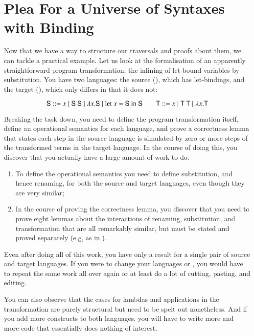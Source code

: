 \chapter{Plea For a Universe of Syntaxes with Binding}

Now that we have a way to structure our traversals and proofs about them,
we can tackle a practical example. Let us look at the formalisation of an
apparently straightforward program transformation: the inlining of let-bound
variables by substitution. You have two languages: the source (), which
has let-bindings, and the target (), which only differs in that it does
not:

\begin{figure}[h]
\begin{displaymath}
  \AD{S} ::= x \mid \AD{S}~\AD{S} \mid \lambda x. \AD{S} \mid \textrm{let }x=\AD{S}\textrm{ in }\AD{S}
  \qquad
  \AD{T} ::= x \mid \AD{T}~\AD{T} \mid \lambda x. \AD{T}
\end{displaymath}
\end{figure}

Breaking the task down, you need to define the program transformation itself,
define an operational semantics for each language, and prove a correctness lemma
that states each step in the source language is simulated by zero or more steps
of the transformed terms in the target language. In the course of doing this,
you discover that you actually have a large amount of work to do:

\begin{enumerate}
\item To define the operational semantics you need to define
  substitution, and hence renaming, for both the source and target
  languages, even though they are very similar;
\item In the course of proving the correctness lemma, you discover
  that you need to prove eight lemmas about the interactions of
  renaming, substitution, and transformation that are all remarkably
  similar, but must be stated and proved separately (e.g, as in
  \cite{benton2012strongly}).
\end{enumerate}

Even after doing all of this work, you have only a result for a single pair of
source and target languages. If you were to change your languages  or
, you would have to repeat the same work all over again or at least do a
lot of cutting, pasting, and editing.

You can also observe that the cases for lambdas and applications in the
transformation are purely structural but need to be spelt out nonetheless.
And if you add more constructs to both languages, you will have to write
more and more code that essentially does nothing of interest.

